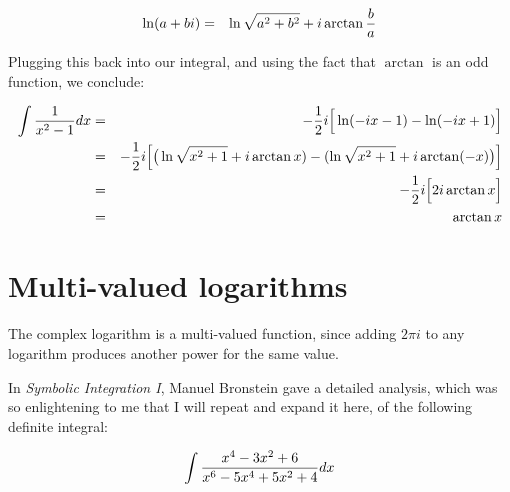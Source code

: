 \begin{eqnarray*}
\ln(a+bi) &=& \ln\sqrt{a^2+b^2} +i\arctan{b\over a} \\
\end{eqnarray*}

Plugging this back into our integral, and using the fact that
$\arctan$ is an odd function, we conclude:

\begin{eqnarray*}
\int{1\over{x^2-1}}dx &=& -{1\over2}i\Big[\ln(-ix-1) - \ln(-ix+1)\Big] \\
&=& -{1\over2}i \Big[\big(\ln\sqrt{x^2+1} + i\arctan{x}) - (\ln\sqrt{x^2+1} + i\arctan(-x)\big) \Big] \\
&=& -{1\over2}i \Big[2 i\arctan{x} \Big] \\
&=& \arctan{x}
\end{eqnarray*}

\section{Multi-valued logarithms}

The complex logarithm is a multi-valued function, since adding $2\pi i$
to any logarithm produces another power for the same value.

In {\it Symbolic Integration I}, Manuel Bronstein gave a detailed
analysis, which was so enlightening to me that I will repeat
and expand it here, of the following definite integral:

\vfill\eject

$$\int {{x^4-3x^2+6}\over{x^6-5x^4+5x^2+4}} dx $$

